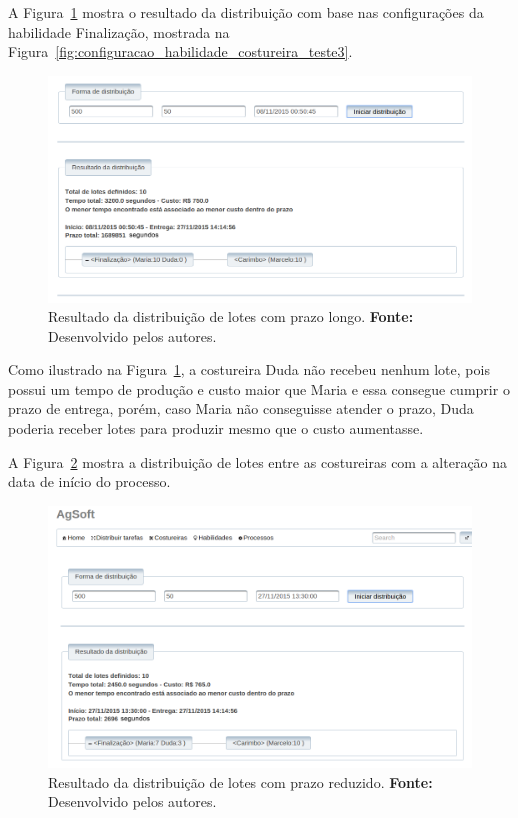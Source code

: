 \par A Figura~\ref{fig:resultado1_teste3} mostra o resultado da distribuição
com base nas configurações da habilidade Finalização, mostrada na
Figura~\ref{fig:configuracao_habilidade_costureira_teste3}.

\begin{figure}[h!]
	\centerline{\includegraphics[width=13cm]{./imagens/resultado1_teste3.png}}
	\caption[Resultado da distribuição de lotes com prazo longo.]
	{Resultado da distribuição de lotes com prazo longo. \textbf{Fonte:} Desenvolvido pelos
	autores.}
	\label{fig:resultado1_teste3}
\end{figure}

\par Como ilustrado na Figura~\ref{fig:resultado1_teste3}, a costureira Duda
não recebeu nenhum lote, pois possui um tempo de produção e custo maior que
Maria e essa consegue cumprir o prazo de entrega, porém, caso Maria não
conseguisse atender o prazo, Duda poderia receber lotes para produzir mesmo que
o custo aumentasse.

A Figura~\ref{fig:resultado2_teste3} mostra a distribuição de lotes entre as
costureiras com a alteração na data de início do processo.

\begin{figure}[h!]
	\centerline{\includegraphics[width=14.7cm]{./imagens/resultado2_teste3.png}}
	\caption[Resultado da distribuição de lotes com prazo reduzido.]
	{Resultado da distribuição de lotes com prazo reduzido. \textbf{Fonte:} Desenvolvido pelos
	autores.}
	\label{fig:resultado2_teste3}
\end{figure}

